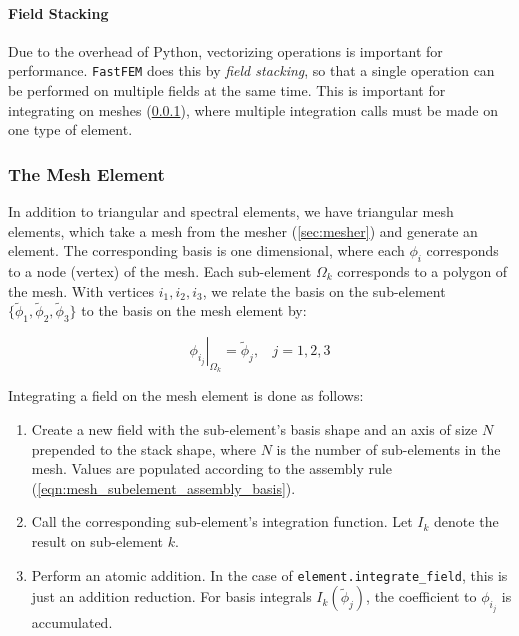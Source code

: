 \paragraph{Field Stacking}

Due to the overhead of Python, vectorizing operations is important for performance. \texttt{FastFEM} does this by \emph{field stacking}, so that a single operation can be performed on multiple fields at the same time. This is important for integrating on meshes (\ref{sec:elem_field:mesh_element}), where multiple integration calls must be made on one type of element.

\subsubsection{The Mesh Element} \label{sec:elem_field:mesh_element}

In addition to triangular and spectral elements, we have triangular mesh elements, which take a mesh from the mesher (\ref{sec:mesher}) and generate an element. The corresponding basis is one dimensional, where each $\phi_i$ corresponds to a node (vertex) of the mesh. Each sub-element $\Omega_k$ corresponds to a polygon of the mesh. With vertices $i_1,i_2,i_3$, we relate the basis on the sub-element $\{\tilde\phi_1,\tilde\phi_2,\tilde\phi_3\}$ to the basis on the mesh element by:

\begin{equation}
    \left.\phi_{i_j}\right|_{\Omega_k} = \tilde\phi_j,~~~~j=1,2,3
    \label{eqn:mesh_subelement_assembly_basis}
\end{equation}

Integrating a field on the mesh element is done as follows:
\begin{enumerate}
\item Create a new field with the sub-element's basis shape and an axis of size $N$ prepended to the stack shape, where $N$ is the number of sub-elements in the mesh. Values are populated according to the assembly rule (\ref{eqn:mesh_subelement_assembly_basis}).
\item Call the corresponding sub-element's integration function. Let $I_k$ denote the result on sub-element $k$.
\item Perform an atomic addition. In the case of \verb+element.integrate_field+, this is just an addition reduction. For basis integrals $I_k(\tilde\phi_j)$, the coefficient to $\phi_{i_j}$ is accumulated.
\end{enumerate}